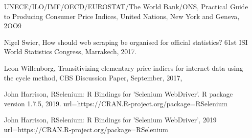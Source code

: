 \documentclass[]{article}
\begin{document}
\begin{thebibliography}{99}
UNECE/ILO/IMF/OECD/EUROSTAT/The World Bank/ONS, 
Practical Guide to Producing Consumer Price Indices, 
United Nations, New York and Geneva, 2OO9


Nigel Swier, 
How should web scraping be organised for official statistics? 
61st ISI World Statistics Congress, Marrakech, 2017.


Leon Willenborg,
Transitivizing elementary price indices for internet data using the cycle method,
CBS Discussion Paper, September, 2017,


John Harrison, 
RSelenium: R Bindings for 'Selenium WebDriver'. R package version 1.7.5, 2019.
url={https://CRAN.R-project.org/package=RSelenium}

John Harrison,
RSelenium: R Bindings for 'Selenium WebDriver', 2019
url={https://CRAN.R-project.org/package=RSelenium}



\end{thebibliography}
\end{document}
